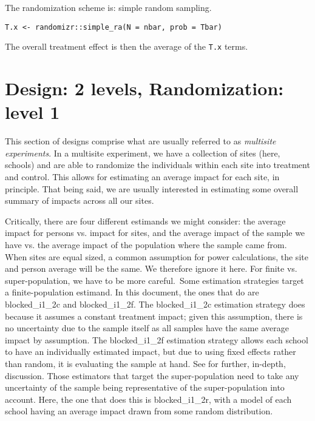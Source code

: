 \documentclass[12pt]{article}
\begin{document}
The randomization scheme is: simple random sampling.
\begin{verbatim}
T.x <- randomizr::simple_ra(N = nbar, prob = Tbar)
\end{verbatim}

The overall treatment effect is then the average of the \texttt{T.x} terms.




\newpage
\section{Design: 2 levels, Randomization: level 1}

This section of designs comprise what are usually referred to as \emph{multisite experiments}.
In a multisite experiment, we have a collection of sites (here, schools) and are able to randomize the individuals within each site into treatment and control.
This allows for estimating an average impact for each site, in principle.
That being said, we are usually interested in estimating some overall summary of impacts across all our sites.

Critically, there are four different estimands we might consider: the average impact for persons vs. impact for sites, and the average impact of the sample we have vs. the average impact of the population where the sample came from.
When sites are equal sized, a common assumption for power calculations, the site and person average will be the same.
We therefore ignore it here.
For finite vs. super-population, we have to be more careful.\
Some estimation strategies target a finite-population estimand.
In this document, the ones that do are blocked\_i1\_2c and blocked\_i1\_2f.
The blocked\_i1\_2c estimation strategy does because it assumes a constant treatment impact; given this assumption, there is no uncertainty due to the sample itself as all samples have the same average impact by assumption.
The blocked\_i1\_2f estimation strategy allows each school to have an individually estimated impact, but due to using fixed effects rather than random, it is evaluating the sample at hand.
See \citet{Miratrix2020} for further, in-depth, discussion.
Those estimators that target the super-population need to take any uncertainty of the sample being representative of the super-population into account.
Here, the one that does this is blocked\_i1\_2r, with a model of each school having an average impact drawn from some random distribution.
\end{document}
